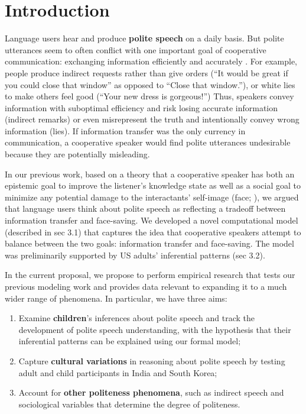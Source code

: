 \section{Introduction}\label{sec:intro}

Language users hear and produce {\bf polite speech} on a daily basis. But polite utterances seem to often conflict with one important goal of cooperative communication: exchanging information efficiently and accurately \citep{Grice1975}. For example, people produce indirect requests rather than give orders (``It would be great if you could close that window'' as opposed to ``Close that window.''), or white lies to make others feel good (``Your new dress is gorgeous!'') Thus, speakers convey information with suboptimal efficiency and risk losing accurate information (indirect remarks) or even misrepresent the truth and intentionally convey wrong information (lies). If information transfer was the only currency in communication, a cooperative speaker would find polite utterances undesirable because they are potentially misleading. 

In our previous work, based on a theory that a cooperative speaker has both an epistemic goal to improve the listener's knowledge state as well as a social goal to minimize any potential damage to the interactants' self-image (face; \citealt{Brown1987}), we argued that language users think about polite speech as reflecting a tradeoff between information transfer and face-saving. We developed a novel computational model (described in sec 3.1) that captures the idea that cooperative speakers attempt to balance between the two goals: information transfer and face-saving. The model was preliminarily supported by US adults' inferential patterns (sec 3.2).

In the current proposal, we propose to perform empirical research that tests our previous modeling work and provides data relevant to expanding it to a much wider range of phenomena. In particular, we have three aims:

\begin{enumerate}

\item Examine {\bf children}'s inferences about polite speech and track the development of polite speech understanding, with the hypothesis that their inferential patterns can be explained using our formal model;

\item Capture {\bf cultural variations} in reasoning about polite speech by testing adult and child participants in India and South Korea;

\item Account for {\bf other politeness phenomena}, such as indirect speech and sociological variables that determine the degree of politeness.

\end{enumerate}

